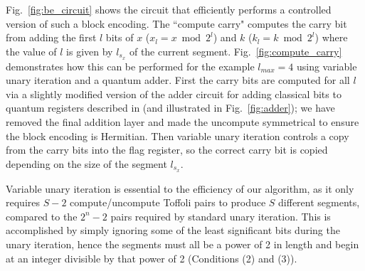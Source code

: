 \documentclass[a4paper,twocolumn,,accepted=2025-05-27]{quantumarticle}
\theoremstyle{empty}
\begin{document}
Fig.~\ref{fig:be_circuit} shows the circuit that efficiently performs a controlled version of such a block encoding. The ``compute carry" computes the carry bit from adding the first $l$ bits of $x$ ($x_l = x \bmod 2^{l}$) and $k$ ($k_l = k \bmod 2^{l}$) where the value of $l$ is given by $l_{s_x}$ of the current segment. Fig.~\ref{fig:compute_carry} demonstrates how this can be performed for the example $l_{max} =4$ using variable unary iteration and a quantum adder. First the carry bits are computed for all $l$ via a slightly modified version of the adder circuit for adding classical bits to quantum registers described in \cite{Sanders_2020} (and illustrated in Fig.~\ref{fig:adder}); we have removed the final addition layer and made the uncompute symmetrical to ensure the block encoding is Hermitian. Then variable unary iteration \cite{Sanders_2020} controls a copy from the carry bits into the flag register, so the correct carry bit is copied depending on the size of the segment $l_{s_x}$. 

Variable unary iteration is essential to the efficiency of our algorithm, as it only requires $S-2$ compute/uncompute Toffoli pairs to produce $S$ different segments, compared to the $2^n-2$ pairs required by standard unary iteration. This is accomplished by simply ignoring some of the least significant bits during the unary iteration, hence the segments must all be a power of 2 in length and begin at an integer divisible by that power of 2 (Conditions (2) and (3)).
\end{document}
